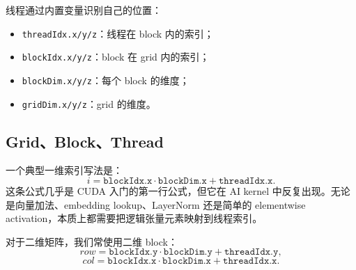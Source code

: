 线程通过内置变量识别自己的位置：

\begin{itemize}
  \item \texttt{threadIdx.x/y/z}：线程在 block 内的索引；
  \item \texttt{blockIdx.x/y/z}：block 在 grid 内的索引；
  \item \texttt{blockDim.x/y/z}：每个 block 的维度；
  \item \texttt{gridDim.x/y/z}：grid 的维度。
\end{itemize}

\subsection{Grid、Block、Thread}
\label{subsec:grid-block-thread}

一个典型一维索引写法是：
\[
  i=\texttt{blockIdx.x}\cdot\texttt{blockDim.x}+\texttt{threadIdx.x}.
\]
这条公式几乎是 CUDA 入门的第一行公式，但它在 AI kernel 中反复出现。无论是向量加法、embedding lookup、LayerNorm 还是简单的 elementwise activation，本质上都需要把逻辑张量元素映射到线程索引。

对于二维矩阵，我们常使用二维 block：
\[
  row=\texttt{blockIdx.y}\cdot\texttt{blockDim.y}+\texttt{threadIdx.y},
\]
\[
  col=\texttt{blockIdx.x}\cdot\texttt{blockDim.x}+\texttt{threadIdx.x}.
\]

